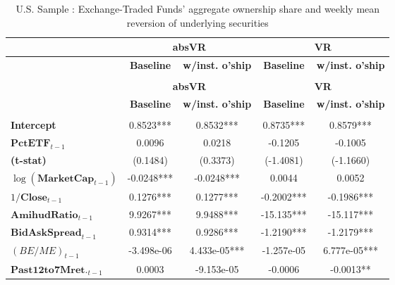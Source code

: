 {\scriptsize\tabcolsep=3pt
\begin{longtable}{>{\bfseries}lcccc}
\toprule
 & \multicolumn{2}{c}{\textbf{absVR}} &  \multicolumn{2}{c}{\textbf{VR}}\\
\midrule
 &   \textbf{Baseline}   & \textbf{w/inst. o'ship} &   \textbf{Baseline}  & \textbf{w/inst. o'ship}  \\
\midrule
\endhead
\caption{U.S. Sample : Exchange-Traded Funds' aggregate ownership share and weekly mean reversion of underlying securities}
\label{tab:short:Efficiency:US:Comp}\\
\toprule
 & \multicolumn{2}{c}{\textbf{absVR}} &  \multicolumn{2}{c}{\textbf{VR}}\\
\midrule
 &   \textbf{Baseline}   & \textbf{w/inst. o'ship} &   \textbf{Baseline}  & \textbf{w/inst. o'ship} \\
\midrule
\endfirsthead
\bottomrule
\multicolumn{5}{r}{\textit{Continues on next page}}\\
\endfoot
\bottomrule
\endlastfoot
Intercept                         &       0.8523***       &              0.8532***             &       0.8735***       &           0.8579***            \\
\rowcolor{blue!20}
$\mathbf{PctETF}_{t-1}$               &       0.0096       &              0.0218             &      -0.1205       &          -0.1005            \\
(t-stat)                               &      (0.1484)      &             (0.3373)            &     (-1.4081)      &         (-1.1660)           \\
$\log(\mathbf{MarketCap}_{t-1})$   &      -0.0248***       &             -0.0248***             &       0.0044       &           0.0052            \\
$1/\mathbf{Close}_{t-1}$       &       0.1276***       &              0.1277***             &      -0.2002***       &          -0.1986***            \\
$\mathbf{AmihudRatio}_{t-1}$        &       9.9267***       &              9.9488***             &      -15.135***       &          -15.117***            \\
$\mathbf{BidAskSpread}_{t-1}$           &       0.9314***       &              0.9286***             &      -1.2190***       &          -1.2179***          \\
$\left(BE/ME\right)_{t-1}$       &     -3.498e-06     &            4.433e-05***            &     -1.257e-05     &         6.777e-05***           \\
$\mathbf{Past 12 to 7M ret.}_{t-1}$       &       0.0003       &            -9.153e-05           &      -0.0006       &          -0.0013**            \\

\end{longtable}}
